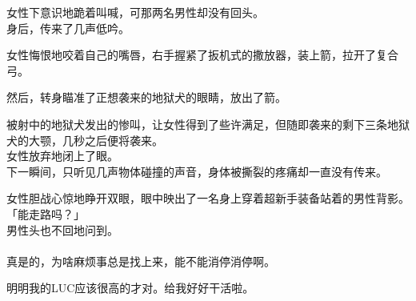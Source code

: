 女性下意识地跪着叫喊，可那两名男性却没有回头。\\

身后，传来了几声低吟。

女性悔恨地咬着自己的嘴唇，右手握紧了扳机式的撒放器，装上箭，拉开了复合弓。

然后，转身瞄准了正想袭来的地狱犬的眼睛，放出了箭。

被射中的地狱犬发出的惨叫，让女性得到了些许满足，但随即袭来的剩下三条地狱犬的大颚，几秒之后便将袭来。\\

女性放弃地闭上了眼。\\

下一瞬间，只听见几声物体碰撞的声音，身体被撕裂的疼痛却一直没有传来。

女性胆战心惊地睁开双眼，眼中映出了一名身上穿着超新手装备站着的男性背影。\\

「能走路吗？」\\

男性头也不回地问到。\\

\sqsplit\\

真是的，为啥麻烦事总是找上来，能不能消停消停啊。

明明我的LUC应该很高的才对。给我好好干活啦。\\


